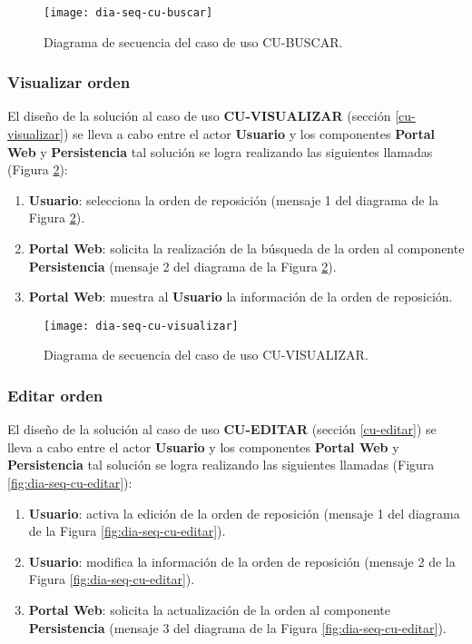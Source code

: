 \begin{figure}[h]
	\centering
	\texttt{[image: dia-seq-cu-buscar]}
	\caption{Diagrama de secuencia del caso de uso CU-BUSCAR.}
	\label{fig:dia-seq-cu-buscar}
\end{figure}

\subsubsection{Visualizar orden}
El diseño de la solución al caso de uso \textbf{CU-VISUALIZAR} (sección \ref{cu-visualizar}) se lleva a cabo entre el actor \textbf{Usuario} y los componentes \textbf{Portal Web} y \textbf{Persistencia} tal solución se logra realizando las siguientes llamadas (Figura \ref{fig:dia-seq-cu-visualizar}):
\begin{enumerate}
	\item \textbf{Usuario}: selecciona la orden de reposición (mensaje 1 del diagrama de la Figura \ref{fig:dia-seq-cu-visualizar}).
	\item \textbf{Portal Web}: solicita la realización de la búsqueda de la orden al componente \textbf{Persistencia} (mensaje 2 del diagrama de la Figura \ref{fig:dia-seq-cu-visualizar}).
	\item \textbf{Portal Web}: muestra al \textbf{Usuario} la información de la orden de reposición.
\end{enumerate}

\begin{figure}[h]
	\centering
	\texttt{[image: dia-seq-cu-visualizar]}
	\caption{Diagrama de secuencia del caso de uso CU-VISUALIZAR.}
	\label{fig:dia-seq-cu-visualizar}
\end{figure}

\subsubsection{Editar orden}
El diseño de la solución al caso de uso \textbf{CU-EDITAR} (sección \ref{cu-editar}) se lleva a cabo entre el actor \textbf{Usuario} y los componentes \textbf{Portal Web} y \textbf{Persistencia} tal solución se logra realizando las siguientes llamadas (Figura \ref{fig:dia-seq-cu-editar}):
\begin{enumerate}
	\item \textbf{Usuario}: activa la edición de la orden de reposición (mensaje 1 del diagrama de la Figura \ref{fig:dia-seq-cu-editar}).
	\item \textbf{Usuario}: modifica la información de la orden de reposición (mensaje 2 de la Figura \ref{fig:dia-seq-cu-editar}).
	\item \textbf{Portal Web}: solicita la actualización de la orden al componente \textbf{Persistencia} (mensaje 3 del diagrama de la Figura \ref{fig:dia-seq-cu-editar}).
\end{enumerate}

